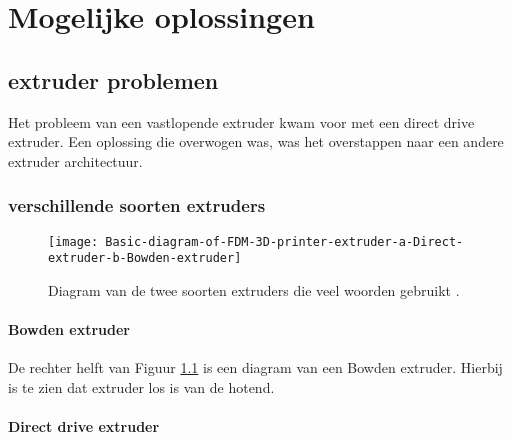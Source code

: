 \chapter{Mogelijke oplossingen}
\label{Mogelijke_oplossingen}

\section{extruder problemen}

Het probleem van een vastlopende extruder kwam voor met een direct drive
extruder. Een oplossing die overwogen was, was het overstappen naar een andere
extruder architectuur.

\subsection{verschillende soorten extruders}

\begin{figure}[h]
    \centerline{\texttt{[image: Basic-diagram-of-FDM-3D-printer-extruder-a-Direct-extruder-b-Bowden-extruder]}}
    \caption{Diagram van de twee soorten extruders die veel woorden gebruikt \cite{soorten_extruders}.}
    \label{fig:soorten_extruders}
\end{figure}

\subsubsection{Bowden extruder}
\label{ss:Bowden_extruder}

De rechter helft van Figuur \ref{fig:soorten_extruders} \cite{soorten_extruders}
is een diagram van een Bowden extruder. Hierbij is te zien dat \ac{extruder} los
is van de \ac{hotend}.


\subsubsection{Direct drive extruder}
\label{ss:direct_drive_extruder}

